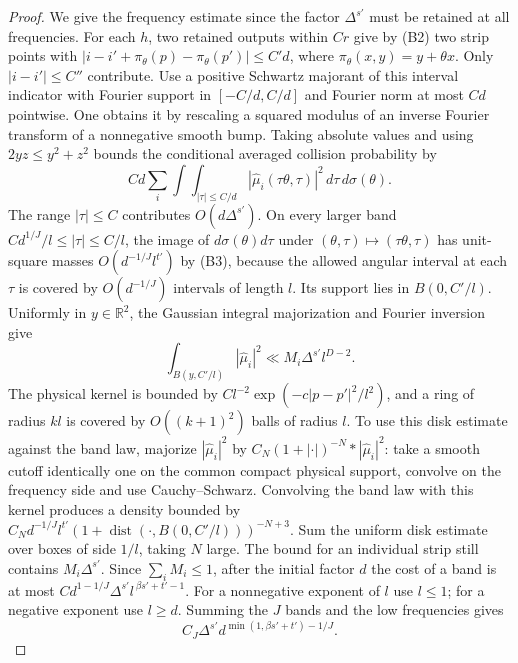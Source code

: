 \documentclass[11pt,a4paper]{article}
\begin{document}
\begin{proof}
We give the frequency estimate since the factor $\Delta^{s'}$ must
be retained at all frequencies. For each $h$, two retained outputs
within $Cr$ give by (B2) two strip points with
$|i-i'+\pi_\theta(p)-\pi_\theta(p')|\le C' d$, where
$\pi_\theta(x,y)=y+\theta x$. Only $|i-i'|\le C''$ contribute.
Use a positive Schwartz majorant of this interval indicator with
Fourier support in $[-C/d,C/d]$ and Fourier norm at most $C d$
pointwise. One obtains it by rescaling a squared modulus of an
inverse Fourier transform of a nonnegative smooth bump. Taking
absolute values and using $2yz\le y^2+z^2$ bounds the conditional
averaged collision probability by
\[
 C d\sum_i\int\int_{|\tau|\le C/d}
         |\widehat\mu_i(\tau\theta,\tau)|^2\,d\tau\,d\sigma(\theta).
\]
The range $|\tau|\le C$ contributes $O(d\Delta^{s'})$. On every
larger band $C d^{1/J}/l\le|\tau|\le C/l$, the image of
$d\sigma(\theta)d\tau$ under $(\theta,\tau)\mapsto(\tau\theta,\tau)$
has unit-square masses $O(d^{-1/J}l^{t'})$ by (B3), because the
allowed angular interval at each $\tau$ is covered by $O(d^{-1/J})$
intervals of length $l$. Its support lies in $B(0,C'/l)$.
Uniformly in $y\in\mathbb R^2$, the Gaussian integral majorization
and Fourier inversion give
\[
 \int_{B(y,C'/l)} |\widehat\mu_i|^2
  \ll M_i\Delta^{s'}l^{D-2}.
\]
The physical kernel is bounded by $Cl^{-2}\exp(-c|p-p'|^2/l^2)$,
and a ring of radius $kl$ is covered by $O((k+1)^2)$ balls of
radius $l$. To use this disk estimate against the band law, majorize
$|\widehat\mu_i|^2$ by $C_N(1+|\cdot|)^{-N}*|\widehat\mu_i|^2$:
take a smooth cutoff identically one on the common compact physical
support, convolve on the frequency side and use Cauchy--Schwarz.
Convolving the band law with this kernel produces a density bounded
by $C_N d^{-1/J}l^{t'}(1+\operatorname{dist}
(\cdot,B(0,C'/l)))^{-N+3}$. Sum the uniform disk estimate over
boxes of side $1/l$, taking $N$ large. The bound for an individual strip
still contains $M_i\Delta^{s'}$. Since $\sum_iM_i\le1$, after the initial
factor $d$ the cost of a band is at most
$C d^{1-1/J}\Delta^{s'} l^{\,\beta s'+t'-1}$.
For a nonnegative exponent of $l$ use $l\le1$; for a negative exponent
use $l\ge d$. Summing the $J$ bands and the low frequencies gives
\[
 C_J\Delta^{s'}d^{\min(1,\beta s'+t')-1/J}.                      \tag{B5}
\]


\end{proof}
\end{document}
